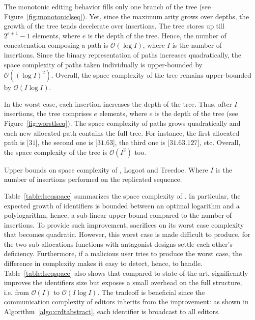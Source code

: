 The monotonic editing behavior fills only one branch of the tree (see
Figure~\ref{fig:monotoniclseq}). Yet, since the maximum arity grows over depths, the
growth of the tree tends decelerate over insertions. The tree stores up till
$2^{e+1}-1$ elements, where $e$ is the depth of the tree. Hence, the number of
concatenation composing a path is $\mathcal{O}(\log I)$, where $I$ is the number
of insertions. Since the binary representation of paths increases quadratically,
the space complexity of paths taken individually is upper-bounded by
$\mathcal{O}((\log I)^2)$.  Overall, the space complexity of the tree remains
upper-bounded by $\mathcal{O}(I\log I)$.

In the worst case, each insertion increases the depth of the tree. Thus, after
$I$ insertions, the tree comprises $e$ elements, where $e$ is the depth of the
tree (see Figure~\ref{fig:worstlseq}). The space complexity of paths grows
quadratically and each new allocated path contains the full tree. For instance,
the first allocated path is [$31$], the second one is [$31.63$], the third one
is [$31.63.127$], etc.  Overall, the space complexity of the tree is
$\mathcal{O}(I^2)$ too.

\begin{table}
  \caption{\label{table:lseqspace}
    Upper bounds on space complexity of \LSEQ, Logoot and Treedoc. Where
    $I$ is the number of insertions performed on the replicated sequence.}
  \centering
  
\end{table}

Table~\ref{table:lseqspace} summarizes the space complexity of \LSEQ. In
particular, the expected growth of identifiers is bounded between an optimal
logarithm and a polylogarithm, hence, a sub-linear upper bound compared to the
number of insertions. To provide such improvement, \LSEQ sacrifices on its worst
case complexity that becomes quadratic. However, this worst case is made
difficult to produce, for the two sub-allocations functions with antagonist
designs settle each other's deficiency. Furthermore, if a malicious user tries
to produce the worst case, the difference in complexity makes it easy to detect,
hence, to handle. Table~\ref{table:lseqspace} also shows that compared to
state-of-the-art, \LSEQ significantly improves the identifiers size but exposes
a small overhead on the full structure, i.e. from $\mathcal{O}(I)$ to
$\mathcal{O}(I\log I)$. The tradeoff is beneficial since the communication
complexity of editors inherits from the improvement: as shown in
Algorithm~\ref{algo:crdtabstract}, each identifier is broadcast to all editors.

